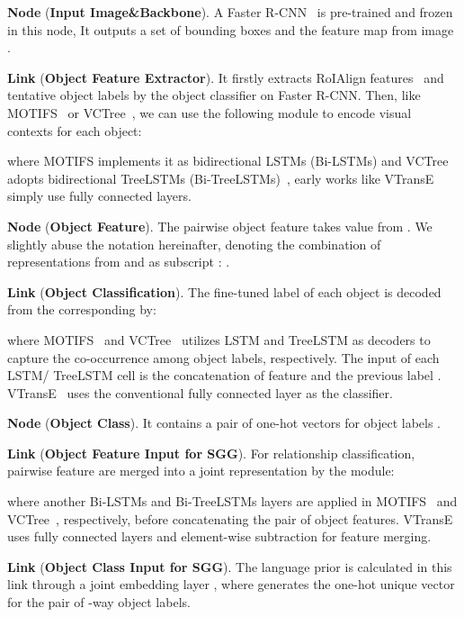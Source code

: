 \documentclass[10pt,twocolumn,letterpaper]{article}
\begin{document}
\noindent\textbf{Node}  (\textbf{Input Image\&Backbone}). A Faster R-CNN~\cite{ren2015faster} is pre-trained and frozen in this node, It outputs a set of bounding boxes  and the feature map  from image .

\noindent\textbf{Link}  (\textbf{Object Feature Extractor}). It firstly extracts RoIAlign features~\cite{he2017mask}  and tentative object labels  by the object classifier on Faster R-CNN. Then, like MOTIFS~\cite{zellers2018neural} or VCTree~\cite{tang2019learning}, we can use the following module to encode visual contexts for each object:

where MOTIFS implements it as bidirectional LSTMs (Bi-LSTMs) and VCTree~\cite{tang2019learning} adopts bidirectional TreeLSTMs (Bi-TreeLSTMs)~\cite{tai2015improved}, early works like VTransE~\cite{zhang2017visual} simply use fully connected layers. 

\noindent\textbf{Node}  (\textbf{Object Feature}). The pairwise object feature  takes value from . We slightly abuse the notation hereinafter, denoting the combination of representations from  and  as subscript : .


\noindent\textbf{Link}  (\textbf{Object Classification}). The fine-tuned label of each object is decoded from the corresponding  by: 

where MOTIFS~\cite{zellers2018neural} and VCTree~\cite{tang2019learning} utilizes LSTM and TreeLSTM as decoders to capture the co-occurrence among object labels, respectively. The input of each LSTM/ TreeLSTM cell is the concatenation of feature and the previous label . VTransE~\cite{zhang2017visual} uses the conventional fully connected layer as the classifier.

\noindent\textbf{Node}  (\textbf{Object Class}). It contains a pair of one-hot vectors for object labels .

\noindent\textbf{Link}  (\textbf{Object Feature Input for SGG}). For relationship classification, pairwise feature  are merged into a joint representation by the module:

where another Bi-LSTMs and Bi-TreeLSTMs layers are applied in MOTIFS~\cite{zellers2018neural} and VCTree~\cite{tang2019learning}, respectively, before concatenating the pair of object features. VTransE~\cite{zhang2017visual} uses fully connected layers and element-wise subtraction for feature merging.

\noindent\textbf{Link}  (\textbf{Object Class Input for SGG}). The language prior is calculated in this link through a joint embedding layer , where  generates the one-hot unique vector  for the pair of -way object labels.
\end{document}
